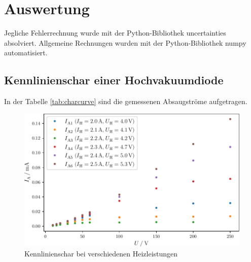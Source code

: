 \section{Auswertung}
\label{sec:Auswertung}
Jegliche Fehlerrechnung wurde mit der Python-Bibliothek uncertainties \cite{uncertainties} absolviert.
Allgemeine Rechnungen wurden mit der Python-Bibliothek numpy \cite{numpy} automatisiert.
\subsection{Kennlinienschar einer Hochvakuumdiode} \label{sub:kenn}
In der Tabelle \ref{tab:charcurve} sind die gemessenen Absaugströme aufgetragen.
\begin{figure}
    \centering
    \caption{Kennlinienschar bei verschiedenen Heizleistungen}
    \label{fig:charcurve}
    \includegraphics[width = \textwidth]{build/charcurve.pdf}
\end{figure}
